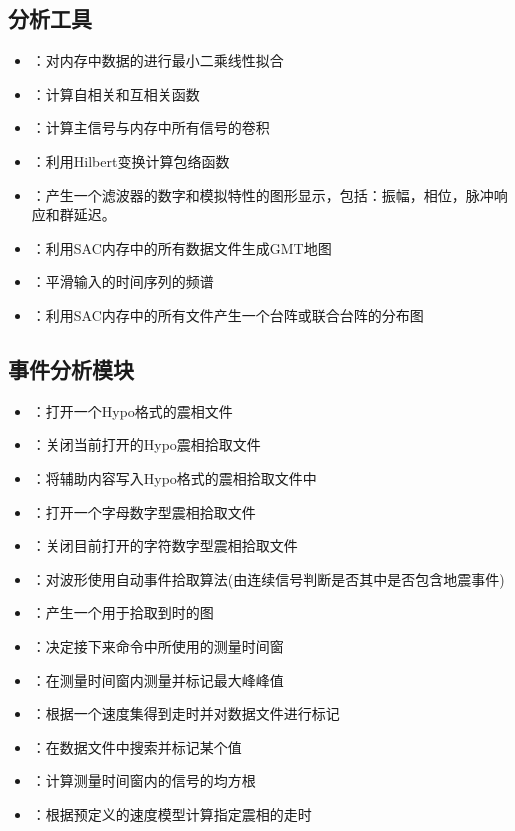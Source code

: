 \subsection*{分析工具}
\begin{itemize}
\item {}：对内存中数据的进行最小二乘线性拟合
\item {}：计算自相关和互相关函数
\item {}：计算主信号与内存中所有信号的卷积
\item {}：利用Hilbert变换计算包络函数
\item {}：产生一个滤波器的数字和模拟特性的图形显示，包括：振幅，相位，脉冲响应和群延迟。
\item {}：利用SAC内存中的所有数据文件生成GMT地图
\item {}：平滑输入的时间序列的频谱
\item {}：利用SAC内存中的所有文件产生一个台阵或联合台阵的分布图
\end{itemize}

\subsection*{事件分析模块}
\begin{itemize}
\item {}：打开一个Hypo格式的震相文件
\item {}：关闭当前打开的Hypo震相拾取文件
\item {}：将辅助内容写入Hypo格式的震相拾取文件中
\item {}：打开一个字母数字型震相拾取文件
\item {}：关闭目前打开的字符数字型震相拾取文件
\item {}：对波形使用自动事件拾取算法(由连续信号判断是否其中是否包含地震事件)
\item {}：产生一个用于拾取到时的图
\item {}：决定接下来命令中所使用的测量时间窗
\item {}：在测量时间窗内测量并标记最大峰峰值
\item {}：根据一个速度集得到走时并对数据文件进行标记
\item {}：在数据文件中搜索并标记某个值
\item {}：计算测量时间窗内的信号的均方根
\item {}：根据预定义的速度模型计算指定震相的走时
\end{itemize}

